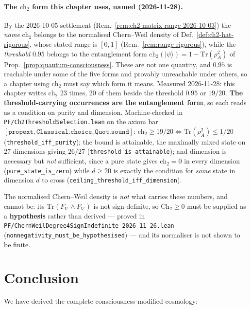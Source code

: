 \paragraph{The $\text{ch}_2$ form this chapter uses, named (2026-11-28).}
By the 2026-10-05 settlement (Rem.~\ref{rem:ch2-matrix-range-2026-10-03}) the
\emph{name} $\text{ch}_2$ belongs to the normalised Chern--Weil density of
Def.~\ref{def:ch2-hat-rigorous}, whose stated range is $[0,1]$
(Rem.~\ref{rem:range-rigorous}), while the \emph{threshold} $0.95$ belongs to the
entanglement form $\text{ch}_2(|\psi\rangle) = 1 - \mathrm{Tr}(\rho_A^2)$ of
Prop.~\ref{prop:quantum-consciousness}. These are not one quantity, and $0.95$ is
reachable under some of the five forms and provably unreachable under others, so a
chapter using $\text{ch}_2$ must say which form it means.
Measured 2026-11-28: this chapter writes $\text{ch}_2$ 23 times, 20 of them
beside the threshold $0.95$ or $19/20$. \textbf{The threshold-carrying occurrences
are the entanglement form}, so each reads as a condition on purity and dimension.
Machine-checked in \texttt{PF/Ch2ThresholdSelection.lean} on the axiom bar
$[\mathtt{propext}, \mathtt{Classical.choice}, \mathtt{Quot.sound}]$:
$\text{ch}_2 \geq 19/20 \iff \mathrm{Tr}(\rho_A^2) \leq 1/20$
(\texttt{threshold\_iff\_purity}); the bound is attainable, the maximally mixed
state on $27$ dimensions giving $26/27$ (\texttt{threshold\_is\_attainable}); and
dimension is necessary but \emph{not} sufficient, since a pure state gives
$\text{ch}_2 = 0$ in every dimension (\texttt{pure\_state\_is\_zero}) while
$d \geq 20$ is exactly the condition for \emph{some} state in dimension $d$ to
cross (\texttt{ceiling\_threshold\_iff\_dimension}).

\noindent The normalised Chern--Weil density is \emph{not} what carries these
numbers, and cannot be: its $\mathrm{Tr}(F_\nabla \wedge F_\nabla)$ is not
sign-definite, so $\mathrm{Ch}_2 \geq 0$ must be supplied as a \textbf{hypothesis}
rather than derived --- proved in
\texttt{PF/ChernWeilDegree4SignIndefinite\_2026\_11\_26.lean}
(\texttt{nonnegativity\_must\_be\_hypothesised}) --- and its normaliser is not
shown to be finite.


\section{Conclusion}

We have derived the complete consciousness-modified cosmology:

